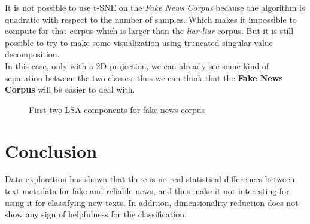 It is not possible to use t-SNE on the \textit{Fake News Corpus} because the algorithm is quadratic with respect to the number of samples. Which makes it impossible to compute for that corpus which is larger than the \textit{liar-liar} corpus. But it is still possible to try to make some visualization using truncated singular value decomposition.\\
In this case, only with a 2D projection, we can already see some kind of separation between the two classes, thus we can think that the \textbf{Fake News Corpus} will be easier to deal with. 
\begin{figure}[h]
  \centering
  \caption{First two LSA components for fake news corpus}
  \label{fig:data_explo:LSA1}
\end{figure}
\section{Conclusion}
Data exploration has shown that there is no real statistical differences between text metadata for fake and reliable news, and thus make it not interesting for using it for classifying new texts. In addition, dimensionality reduction does not show any sign of helpfulness for the classification. 